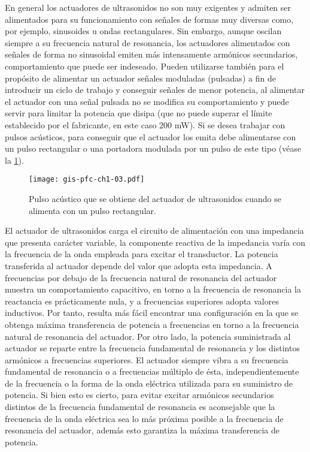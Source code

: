 En general los actuadores de ultrasonidos no son muy exigentes y admiten
ser alimentados para su funcionamiento con señales de formas muy diversas
como, por ejemplo, sinusoides u ondas rectangulares. Sin embargo, aunque
oscilan siempre a su frecuencia natural de resonancia, los actuadores
alimentados con señales de forma no sinusoidal emiten más intensamente
armónicos secundarios, comportamiento que puede ser indeseado. Pueden
utilizarse también para el propósito de alimentar un actuador señales
moduladas (pulsadas) a fin de introducir un ciclo de trabajo y conseguir
señales de menor potencia, al alimentar el actuador con una señal pulsada
no se modifica su comportamiento y puede servir para limitar la potencia
que disipa (que no puede superar el límite establecido por el fabricante,
en este caso 200 mW). Si se desea trabajar con pulsos acústicos, para
conseguir que el actuador los emita debe alimentarse con un pulso
rectangular o una portadora modulada por un pulso de este tipo (véase la
\cref{fig:pulse}).

\sshortpage{}

\begin{figure}
	\begin{center}
		\texttt{[image: gis-pfc-ch1-03.pdf]}
	\end{center}
	\caption[Pulso acústico generado por el actuador de
	ultrasonidos]{Pulso acústico que se obtiene del actuador de
	ultrasonidos cuando se alimenta con un pulso rectangular.}
	\label{fig:pulse}
\end{figure}

El actuador de ultrasonidos carga el circuito de alimentación con una
impedancia que presenta carácter variable, la componente reactiva de la
impedancia varía con la frecuencia de la onda empleada para excitar el
transductor. La potencia transferida al actuador depende del valor que
adopta esta impedancia. A frecuencias por debajo de la frecuencia natural
de resonancia del actuador muestra un comportamiento capacitivo, en torno a
la frecuencia de resonancia la reactancia es prácticamente nula, y a
frecuencias superiores adopta valores inductivos. Por tanto, resulta más
fácil encontrar una configuración en la que se obtenga máxima transferencia
de potencia a frecuencias en torno a la frecuencia natural de resonancia
del actuador. Por otro lado, la potencia suministrada al actuador se
reparte entre la frecuencia fundamental de resonancia y los distintos
armónicos a frecuencias superiores. El actuador siempre vibra a su
frecuencia fundamental de resonancia o a frecuencias múltiplo de ésta,
independientemente de la frecuencia o la forma de la onda eléctrica
utilizada para su suministro de potencia. Si bien esto es cierto, para
evitar excitar armónicos secundarios distintos de la frecuencia fundamental
de resonancia es aconsejable que la frecuencia de la onda eléctrica sea lo
más próxima posible a la frecuencia de resonancia del actuador, además esto
garantiza la máxima transferencia de potencia.

